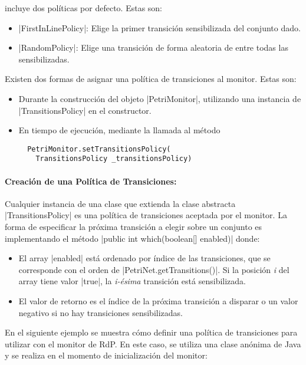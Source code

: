 \javapetriconcurrencymonitor incluye dos políticas por defecto. Estas son:
\begin{itemize}
    \item {}|FirstInLinePolicy|: Elige la primer transición
    sensibilizada del conjunto dado.
    \item {}|RandomPolicy|: Elige una transición de forma aleatoria de
    entre todas las sensibilizadas.
\end{itemize}

Existen dos formas de asignar una política de transiciones al monitor. Estas
son:

\begin{itemize}
    \item Durante la construcción del objeto |PetriMonitor|,
    utilizando una instancia de |TransitionsPolicy| en el
    constructor.
    \item En tiempo de ejecución, mediante la llamada al método\\ {
    \begin{verbatim}
  PetriMonitor.setTransitionsPolicy(
    TransitionsPolicy _transitionsPolicy)
    \end{verbatim}
    }
\end{itemize}

\paragraph{Creación de una Política de Transiciones:}
Cualquier instancia de una clase que extienda la clase abstracta
|TransitionsPolicy| es una política de transiciones aceptada por el
monitor. La forma de especificar la próxima transición a elegir sobre un
conjunto es implementando el método |public int which(boolean[]
enabled)| donde:
\begin{itemize}
    \item El array |enabled| está ordenado por índice de las
    transiciones, que se corresponde con el orden de
    |PetriNet.getTransitions()|. Si la posición \textit{i} del array
    tiene valor |true|, la \textit{i-ésima} transición está
    sensibilizada.
    \item El valor de retorno es el índice de la próxima transición a disparar
    o un valor negativo si no hay transiciones sensibilizadas.
\end{itemize}

En el siguiente ejemplo se muestra cómo definir una política de transiciones
para utilizar con el monitor de RdP. En este caso, se utiliza una clase anónima
de Java y se realiza en el momento de inicialización del monitor:

